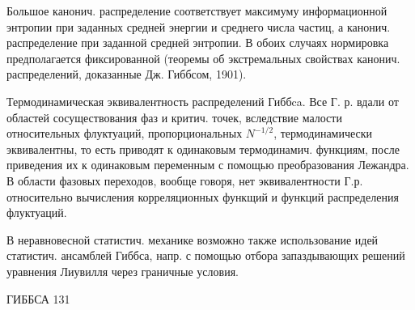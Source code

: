 \documentclass[10pt]{article}
\begin{document}
Большое канонич. распределение соответствует максимуму информационной энтропии при заданных средней энергии и среднего числа частиц, а канонич. распределение при заданной средней энтропии. В обоих случаях нормировка предполагается фиксированной (теоремы об экстремальных свойствах канонич. распределений, доказанные Дж. Гиббсом, 1901).



Термодинамическая эквивалентность распределений Гиббca. Все Г. р. вдали от областей сосуществования фаз и критич. точек, вследствие малости относительных флуктуаций, пропорциональных $N^{-1 / 2}$, термодинамически эквивалентны, то есть приводят к одинаковым термодинамич. функциям, после приведения их к одинаковым переменным с помощью преобразования Лежандра. В области фазовых переходов, вообще говоря, нет эквивалентности Г.р. относительно вычисления корреляционных функщий и функций распределения флуктуаций.



В неравновесной статистич. механике возможно также использование идей статистич. ансамблей Гиббса, напр. с помощью отбора запаздывающих решений уравнения Лиувилля через граничные условия.



ГИББСА 131
\end{document}
